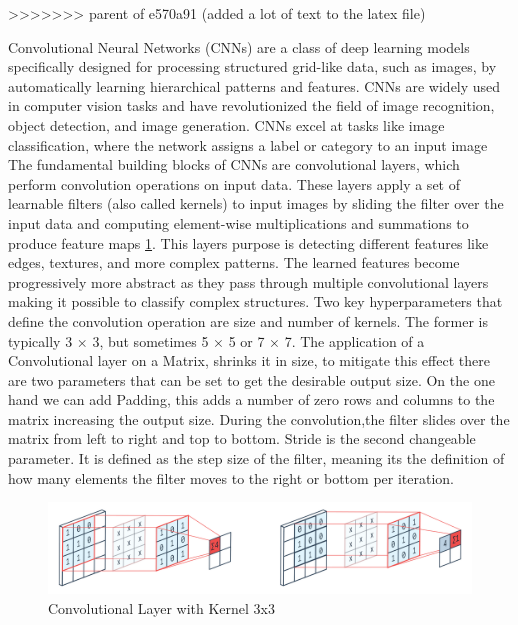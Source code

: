 \documentclass[
a4paper, 
12pt,
grayscalebody, %
abstract=on,
twoside, BCOR10mm, 12pt, DIV13,headinclude, footexclude, final, abstracton, openright
]{ibireprt}
\numberwithin{equation}{chapter}
\numberwithin{table}{chapter}
\numberwithin{figure}{chapter}
\numberwithin{algorithm}{chapter}
\numberwithin{example}{chapter}
\numberwithin{example}{chapter}
\begin{document}
>>>>>>> parent of e570a91 (added a lot of text to the latex file)

Convolutional Neural Networks (CNNs) are a class of deep learning models specifically designed for processing structured grid-like data, such as images, by automatically learning hierarchical patterns and features. CNNs are widely used in computer vision tasks and have revolutionized the field of image recognition, object detection, and image generation. CNNs excel at tasks like image classification, where the network assigns a label or category to an input image\\

The fundamental building blocks of CNNs are convolutional layers, which perform convolution operations on input data. These layers apply a set of learnable filters (also called kernels) to input images by sliding the filter over the input data and computing element-wise multiplications and summations to produce feature maps \ref{fig:fig2}. This layers purpose is detecting different features like edges, textures, and more complex patterns. The learned features become progressively more abstract as they pass through multiple convolutional layers making it possible to classify complex structures.	Two key hyperparameters that define the convolution operation are size and number of kernels. The former is typically 3 × 3, but sometimes 5 × 5 or 7 × 7. The application of a Convolutional layer on a Matrix, shrinks it in size, to mitigate this effect there are two parameters that can be set to get the desirable output size. On the one hand we can add Padding, this adds a number of zero rows and columns to the matrix increasing the output size. During the convolution,the filter slides over the matrix from left to right and top to bottom. Stride is the second changeable parameter. It is defined as the step size of the filter, meaning its the definition of how many elements the filter moves to the right or bottom per iteration.\\%

\begin{figure}[h]
	\center
	\includegraphics[width = 1 \textwidth]{Conv_Layer.png}%
	\caption{Convolutional Layer with Kernel 3x3}
	\label{fig:fig2}
\end{figure}
\end{document}
